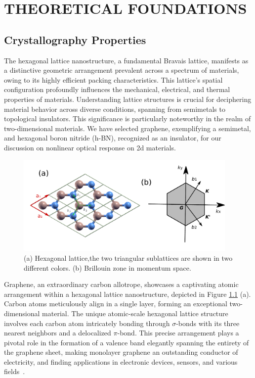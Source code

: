 \chapter{THEORETICAL FOUNDATIONS}
\label{ch:ch2}
\section{Crystallography Properties}
The hexagonal lattice nanostructure, a fundamental Bravais lattice, manifests as a distinctive geometric arrangement prevalent across a spectrum of materials, owing to its highly efficient packing characteristics. This lattice's spatial configuration profoundly influences the mechanical, electrical, and thermal properties of materials. Understanding lattice structures is crucial for deciphering material behavior across diverse conditions, spanning from semimetals to topological insulators. This significance is particularly noteworthy in the realm of two-dimensional materials. We have selected graphene, exemplifying a semimetal, and hexagonal boron nitride (h-BN), recognized as an insulator, for our discussion on nonlinear optical response on 2d materials.\\
\begin{figure}[htpb]
	\centering
	\includegraphics[width=0.96\textwidth]{pic/lattice.pdf}
	\caption[Lab coordinate system]{(a) Hexagonal lattice,the two triangular sublattices are shown
		in two different colors. (b) Brillouin zone in momentum space.}
	\label{fig: lattice}
\end{figure}
Graphene, an extraordinary carbon allotrope, showcases a captivating atomic arrangement within a
hexagonal lattice nanostructure, depicted in Figure \ref{fig: lattice} (a). Carbon atoms
meticulously align in a single layer, forming an exceptional two-dimensional material. The unique
atomic-scale hexagonal lattice structure involves each carbon atom intricately bonding through
$\sigma$-bonds with its three nearest neighbors and a delocalized $\pi$-bond. This precise
arrangement plays a pivotal role in the formation of a valence band elegantly spanning the entirety
of the graphene sheet, making monolayer graphene an outstanding conductor of electricity, and
finding applications in electronic devices, sensors, and various fields~\cite{sarma2011electronic}.


